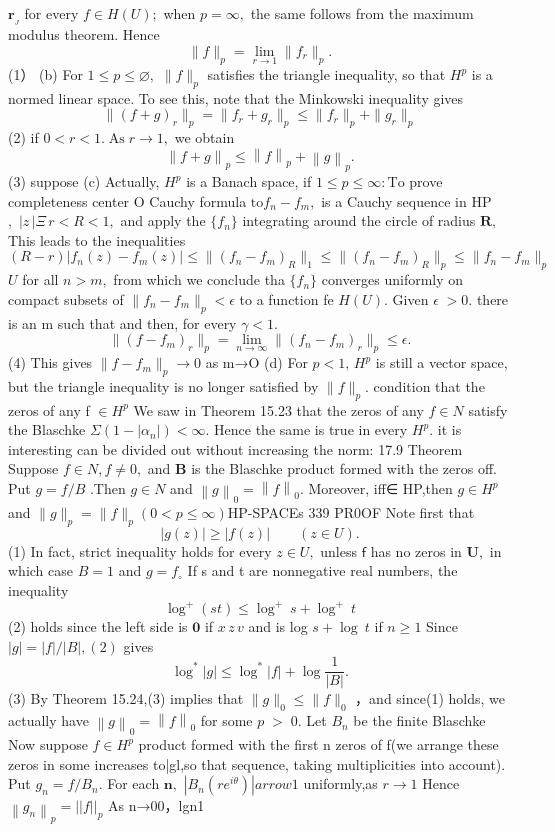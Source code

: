 ${\boldsymbol{r}}_{\!_{J}}$ for every $f\in H(U);$ when $p=\infty,$ the same follows from the maximum modulus theorem. Hence $$ \|f\|_{p}=\operatorname*{lim}_{r\to1}\|f_{r}\|_{p}. $$ (1） (b) For $1\leq p\leq\varnothing,$ $\|f\|_{p}$ satisfies the triangle inequality, so that $H^{p}$ is a normed linear space. To see this, note that the Minkowski inequality gives $$ \|(f+g)_{r}\|_{p}=\|f_{r}+g_{r}\|_{p}\leq\|f_{r}\|_{p}+\|g_{r}\|_{p} $$ (2) if $0<r<1.\;\mathrm{As}\;r\to1,$ we obtain $$ \left\|f+g\right\|_{p}\leq\left\|f\right\|_{p}+\left\|g\right\|_{p}. $$ (3) suppose (c) Actually, $H^{p}$ is a Banach space, if $1\leq p\leq\infty:\mathrm{To}$ prove completeness center O Cauchy formula $\mathrm{to}f_{n}-f_{m},$ is a Cauchy sequence in HP $,\,\,|z\,|\Xi\,r<R<1,$ and apply the $\{f_{n}\}$ integrating around the circle of radius ${\boldsymbol{R}},$ This leads to the inequalities $$ (R-r)|f_{n}(z)-f_{m}(z)|\leq\|(f_{n}-f_{m})_{R}\|_{1}\leq\|(f_{n}-f_{m})_{R}\|_{p}\leq\|f_{n}-f_{m}\|_{p} $$ $U$ for all $n>m,$ from which we conclude tha $\{f_{n}\}$ converges uniformly on compact subsets of $\|f_{n}-f_{m}\|_{p}<\epsilon$ to a function fe $H(U).$ Given $\scriptstyle\epsilon\;>0.$ there is an m such that and then, for every $\gamma<1.$ $$ \|(f-f_{m})_{r}\|_{p}=\operatorname*{lim}_{n\to\infty}\|(f_{n}-f_{m})_{r}\|_{p}\leq\epsilon. $$ (4) This gives $\|f-f_{m}\|_{p}\to0$ as m→O (d) For $p<1,\,H^{p}$ is still a vector space, but the triangle inequality is no longer satisfied by $\|f\|_{p}.$ condition that the zeros of any f $\in H^{p}$ We saw in Theorem 15.23 that the zeros of any $f\in N$ satisfy the Blaschke $\Sigma(1-|\alpha_{n}|)<\infty.$ Hence the same is true in every $H^{p}.$ it is interesting can be divided out without increasing the norm: 17.9 Theorem Suppose $f\in N,f\neq0,$ and $\boldsymbol{B}$ is the Blaschke product formed with the zeros off. Put $g=f/B$ .Then $g\in N$ and $\left\|g\right\|_{0}=\left\|f\right\|_{0}.$ Moreover, iff∈ HP,then $g\in H^{p}$ and $\|g\|_{p}=\|f\|_{p}(0<p\leq\infty)$HP-SPACEs 339 PR0OF Note first that $$ |g(z)|\geq|f(z)|\qquad(z\in U). $$ (1) In fact, strict inequality holds for every $z\in U,$ unless $\boldsymbol{\mathsf{f}}$ has no zeros in ${\boldsymbol{U}},$ in which case $\scriptstyle{B=1}$ and $\scriptstyle{g=f_{\circ}}$ If s and t are nonnegative real numbers, the inequality $$ \log^{+}\left(s t\right)\leq\log^{+}\ s+\log^{+}\ t $$ (2) holds since the left side is $\mathbf{0}$ if $\scriptstyle x\,z\,v$ and is log $s+\log\ t$ if $\scriptstyle n\geq1$ Since $|g|=|f|/|B|,(2)$ gives $$ \log^{*}\left|g\right|\leq\log^{*}\left|f\right|+\log{\frac{1}{\left|B\right|}}. $$ (3) By Theorem 15.24,(3) implies that $\|g\|_{0}\leq\|f\|_{0}$ ，and since(1) holds, we actually have $\left\|g\right\|_{0}=\left\|f\right\|_{0}$ for some $\scriptstyle{p\;>\;0.}$ Let $B_{n}$ be the finite Blaschke Now suppose $f\in H^{p}$ product formed with the first n zeros of f(we arrange these zeros in some increases to|gl,so that sequence, taking multiplicities into account). Put $g_{n}=f/B_{n}.$ For each ${\boldsymbol{n}},$ $|B_{n}(r e^{i\theta})| arrow1$ uniformly,as $r\to1$ Hence $\left\|g_{n}\right\|_{p}=\left|\left|f\right|\right|_{p}$ As n→00，lgn1 $$ 